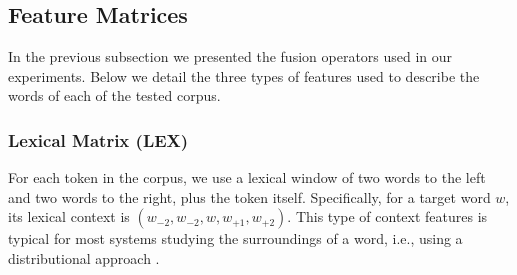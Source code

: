 \documentclass{llncs}
\begin{document}
\begin{enumerate}
	\end{enumerate}   
\subsection{Feature Matrices}
In the previous subsection we presented the fusion operators used in our experiments. Below we detail the three types of features used to describe the words of each of the tested corpus.
\subsubsection{Lexical Matrix (LEX)}
For each token in the corpus, we use a lexical window of two words to the left and two words to the right, plus the token itself. Specifically, for a target word $w$, its lexical context is $(w_{-2}, w_{-2}, w, w_{+1}, w_{+2})$. This type of context features is typical for most systems studying the surroundings of a word, i.e., using a distributional approach \cite{LevyG14}.
\end{document}
